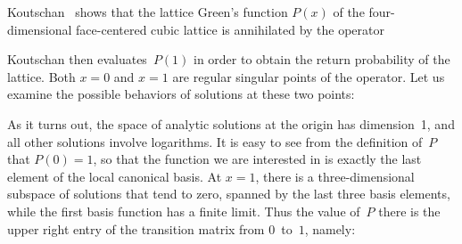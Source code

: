 \documentclass[runningheads,a4paper]{llncs}
\begin{document}
\begin{example}
  Koutschan~{\cite{Koutschan2013b}} shows that the lattice Green's function $P
  (x)$ of the four-dimensional face-centered cubic lattice is annihilated by the
  operator
  
  
  {\noindent}Koutschan then evaluates~$P (1)$ in order to obtain the return probability
  of the lattice. Both $x = 0$ and $x = 1$ are regular singular points of the
  operator. Let us examine the possible behaviors of solutions at these two
  points:
  
  
  {\noindent}As it turns out, the space of analytic solutions at the origin
  has dimension~1, and all other solutions involve logarithms. It is easy to
  see from the definition of~$P$ that $P (0) = 1$, so that the function we are
  interested in is exactly the last element of the local canonical basis. At
  $x = 1$, there is a three-dimensional subspace of solutions that tend to
  zero, spanned by the last three basis elements, while the first basis
  function has a finite limit. Thus the value of~$P$ there is the upper right
  entry of the transition matrix from $0$~to~$1$, namely:
  
\end{example}
\end{document}
